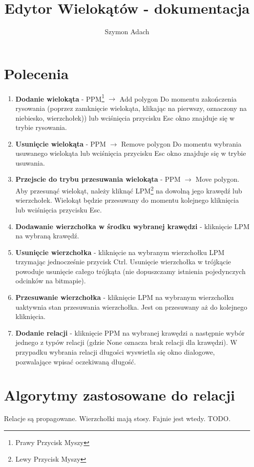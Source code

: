\documentclass[]{article}
\title{Edytor Wielokątów - dokumentacja}
\author{Szymon Adach}
\begin{document}
\maketitle

\section{Polecenia}
\begin{enumerate}
	\item \textbf{Dodanie wielokąta} - PPM\footnote{Prawy Przycisk Myszy} $\rightarrow$ Add polygon \newline
	Do momentu zakończenia rysowania (poprzez zamknięcie wielokąta, klikając na pierwszy, oznaczony na niebiesko, wierzchołek)) lub wciśnięcia przycisku Esc okno znajduje się w trybie rysowania.
	\item \textbf{Usunięcie wielokąta} - PPM $\rightarrow$ Remove polygon
	Do momentu wybrania usuwanego wielokąta lub wciśnięcia przycisku Esc okno znajduje się w trybie usuwania.
	\item \textbf{Przejscie do trybu przesuwania wielokąta} - PPM $\rightarrow$ Move polygon. \newline
	Aby przesunąć wielokąt, należy kliknąć LPM\footnote{Lewy Przycisk Myszy} na dowolną jego krawędź lub wierzchołek. Wielokąt będzie przesuwany do momentu kolejnego kliknięcia lub wciśnięcia przycisku Esc.
	\item \textbf{Dodawanie wierzchołka w środku wybranej krawędzi} - kliknięcie LPM na wybraną krawędź.
	\item \textbf{Usunięcie wierzchołka} - kliknięcie na wybranym wierzchołku LPM trzymając jednocześnie przycisk Ctrl. Usunięcie wierzchołka w trójkącie powoduje usunięcie całego trójkąta (nie dopuszczamy istnienia pojedynczych odcinków na bitmapie).
	\item \textbf{Przesuwanie wierzchołka} - kliknięcie LPM na wybranym wierzchołku uaktywnia stan przesuwania wierzchołka. Jest on przesuwany aż do kolejnego kliknięcia.
	\item \textbf{Dodanie relacji} - kliknięcie PPM na wybranej krawędzi a następnie wybór jednego z typów relacji (gdzie None oznacza brak relacji dla krawędzi). W przypadku wybrania relacji długości wyswietla się okno dialogowe, pozwalające wpisać oczekiwaną długość.
\end{enumerate}
\section{Algorytmy zastosowane do relacji}
Relacje są propagowane. Wierzchołki mają stosy. Fajnie jest wtedy. TODO.
\end{document}

